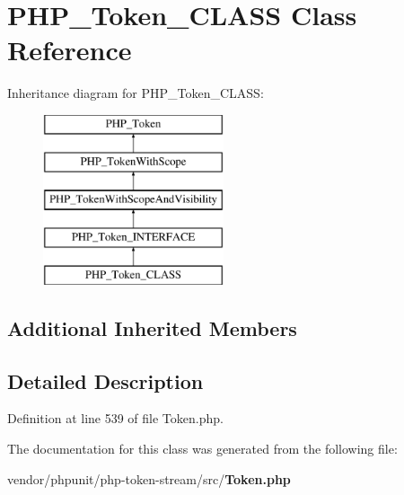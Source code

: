 \section{P\+H\+P\+\_\+\+Token\+\_\+\+C\+L\+A\+S\+S Class Reference}
\label{class_p_h_p___token___c_l_a_s_s}
Inheritance diagram for P\+H\+P\+\_\+\+Token\+\_\+\+C\+L\+A\+S\+S\+:\begin{figure}[H]
\begin{center}
\leavevmode
\includegraphics[height=5.000000cm]{class_p_h_p___token___c_l_a_s_s}
\end{center}
\end{figure}
\subsection*{Additional Inherited Members}


\subsection{Detailed Description}


Definition at line 539 of file Token.\+php.



The documentation for this class was generated from the following file\+:\begin{DoxyCompactItemize}
\item 
vendor/phpunit/php-\/token-\/stream/src/{\bf Token.\+php}\end{DoxyCompactItemize}
